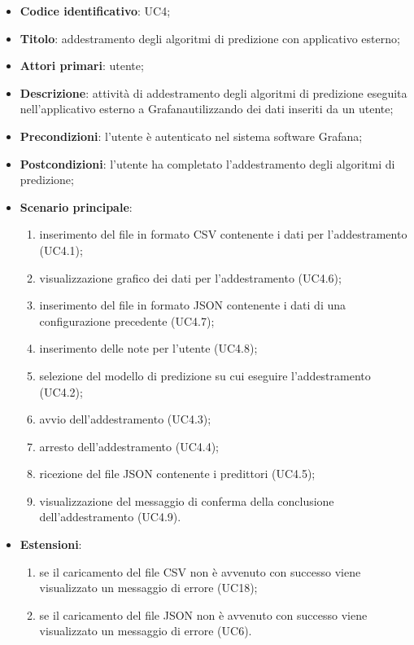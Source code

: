 \begin{itemize}
    \item \textbf{Codice identificativo}: UC4;
    \item \textbf{Titolo}: addestramento degli algoritmi di predizione con applicativo esterno;
    \item \textbf{Attori primari}: utente;
    \item \textbf{Descrizione}: attività di addestramento degli algoritmi di predizione eseguita nell'applicativo esterno a Grafana\glosp utilizzando dei dati inseriti da un utente;
    \item \textbf{Precondizioni}: l'utente è autenticato nel sistema software Grafana\glo;
    \item \textbf{Postcondizioni}: l'utente ha completato l'addestramento degli algoritmi di predizione;
    \item \textbf{Scenario principale}: 
        \begin{enumerate}
            \item inserimento del file in formato CSV contenente i dati per l'addestramento (UC4.1);
            \item visualizzazione grafico dei dati per l'addestramento (UC4.6);
            \item inserimento del file in formato JSON contenente i dati di una configurazione precedente (UC4.7);
            \item inserimento delle note per l'utente (UC4.8);
            \item selezione del modello di predizione su cui eseguire l'addestramento (UC4.2);
            \item avvio dell'addestramento (UC4.3);
    		\item arresto dell'addestramento (UC4.4);
            \item ricezione del file JSON contenente i predittori (UC4.5);
            \item visualizzazione del messaggio di conferma della conclusione dell'addestramento (UC4.9). 
        \end{enumerate}
    \item \textbf{Estensioni}:
	    \begin{enumerate}
	    	\item se il caricamento del file CSV non è avvenuto con successo viene visualizzato un messaggio di errore (UC18);
	    	\item se il caricamento del file JSON non è avvenuto con successo viene visualizzato un messaggio di errore (UC6).
	    \end{enumerate}
\end{itemize}

